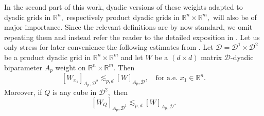 \documentclass{article}
\theoremstyle{definition}
\theoremstyle{remark}
\numberwithin{equation}{section}
\newcommand{\mathdm}{\,\mathrm{dm}}
\newcommand{\cD}{\mathcal{D}}
\newcommand{\cW}{\mathcal{W}}
\newcommand{\bfD}{\bm{\mathcal{D}}}
\newcommand{\reals}{\mathbb{R}}
\newcommand{\1}{\mathbf{1}}
\begin{document}
    In the second part of this work, dyadic versions of these weights adapted to dyadic grids in $\reals^n,$ respectively product dyadic grids in $\reals^n\times\reals^m,$ will also be of major importance. Since the relevant definitions are by now standard, we omit repeating them and instead refer the reader to the detailed exposition in \cite[Subsection 3.3]{DKPS2024}. Let us only stress for later convenience the following estimates from \cite{DKPS2024}. Let $\bfD=\cD^1\times\cD^2$ be a product dyadic grid in $\reals^n\times\reals^m$ and let $W$ be a $(d\times d)$ matrix $\bfD$-dyadic biparameter $A_p$ weight on $\reals^n\times\reals^m.$
    Then
    \begin{equation}
        \label{uniform slicing variable}
        [W_{x_1}]_{A_p,\cD^2}\lesssim_{p,d}[W]_{A_p,\bfD},\quad\text{for a.e. }x_1\in\reals^n.
    \end{equation}
    Moreover, if $Q$ is any cube in $\cD^2,$ then
    \begin{equation}
        \label{uniform domination of characteristics of averages}
        [W_{Q}]_{A_p,\cD^1}\lesssim_{p,d}[W]_{A_p,\bfD}.
    \end{equation}
   

\end{document}
